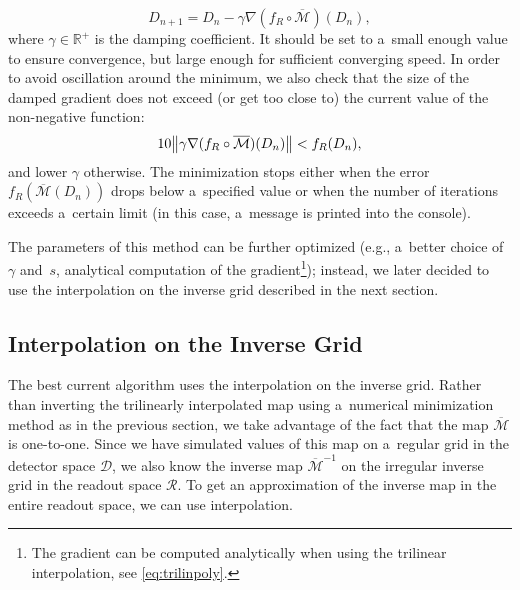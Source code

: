 				\begin{equation}
					D_{n+1} = D_n - \gamma \nabla(f_R\circ\overline{\mathcal{M}})(D_n),
				\end{equation}
			where $\gamma\in\mathbb{R}^+$ is the damping coefficient. It should be set to a~small enough value to ensure convergence, but large enough for sufficient converging speed. In order to avoid oscillation around the minimum, we also check that the size of the damped gradient does not exceed (or get too close to) the current value of the non-negative function:
				\begin{equation}
					10 \norm{\gamma \nabla(f_R\circ\overline{\mathcal{M}})(D_n)} < f_R(D_n),
				\end{equation}
			and lower $\gamma$ otherwise. The minimization stops either when the error $f_R(\overline{\mathcal{M}}(D_n))$ drops below a~specified value or when the number of iterations exceeds a~certain limit (in this case, a~message is printed into the console).
			
			The parameters of this method can be further optimized (e.g., a~better choice of $\gamma$ and~$s$, analytical computation of the gradient\footnote{The gradient can be computed analytically when using the trilinear interpolation, see \cref{eq:trilinpoly}.}); instead, we later decided to use the interpolation on the inverse grid described in the next section.
			
		
		\subsection{Interpolation on the Inverse Grid}
		\label{sec:interpol}			
			The best current algorithm uses the interpolation on the inverse grid. Rather than inverting the trilinearly interpolated map using a~numerical minimization method as in the previous section, we take advantage of the fact that the map $\overline{\mathcal{M}}$ is one-to-one. Since we have simulated values of this map on a~regular grid in the detector space $\mathcal{D}$, we also know the inverse map $\overline{\mathcal{M}}^{-1}$ on the irregular inverse grid in the readout space $\mathcal{R}$. To get an approximation of the inverse map in the entire readout space, we can use interpolation.
			
